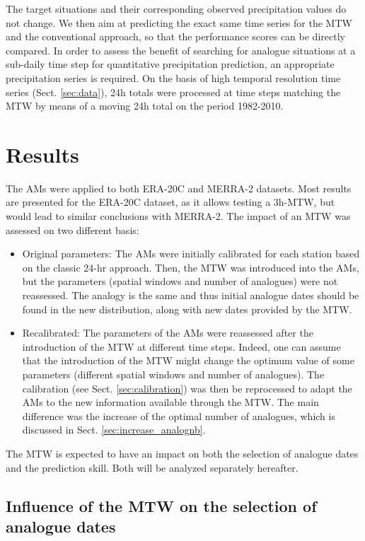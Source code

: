 \documentclass[hess, manuscript]{copernicus}
\begin{document}
	The target situations and their corresponding observed precipitation values do not change. We then aim at predicting the exact same time series for the MTW and the conventional approach, so that the performance scores can be directly compared. In order to assess the benefit of searching for analogue situations at a sub-daily time step for quantitative precipitation prediction, an appropriate precipitation series is required. On the basis of high temporal resolution time series (Sect. \ref{sec:data}), 24h totals were processed at time steps matching the MTW by means of a moving 24h total on the period 1982-2010. 
	

	\section{Results}
	\label{sec:results}
	
	The AMs were applied to both ERA-20C and MERRA-2 datasets. Most results are presented for the ERA-20C dataset, as it allows testing a 3h-MTW, but would lead to similar conclusions with MERRA-2. The impact of an MTW was assessed on two different basis:
	\begin{itemize}
		\item Original parameters: The AMs were initially calibrated for each station based on the classic 24-hr approach. Then, the MTW was introduced into the AMs, but the parameters (spatial windows and number of analogues) were not reassessed. The analogy is the same and thus initial analogue dates should be found in the new distribution, along with new dates provided by the MTW.
		\item Recalibrated: The parameters of the AMs were reassessed after the introduction of the MTW at different time steps. Indeed, one can assume that the introduction of the MTW might change the optimum value of some parameters (different spatial windows and number of analogues). The calibration (see Sect. \ref{sec:calibration}) was then be reprocessed to adapt the AMs to the new information available through the MTW. The main difference was the increase of the optimal number of analogues, which is discussed in Sect. \ref{sec:increase_analognb}.
	\end{itemize}

	The MTW is expected to have an impact on both the selection of analogue dates and the prediction skill. Both will be analyzed separately hereafter.
	
	\subsection{Influence of the MTW on the selection of analogue dates}
	\label{sec:influence_analogue_dates}
	
\end{document}
